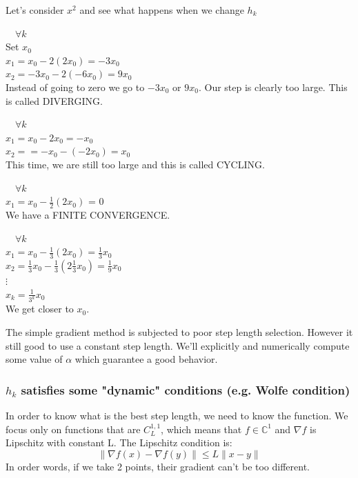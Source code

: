 \begin{example}\begin{leftbar}
Let's consider $x^2$ and see what happens when we change $h_k$

 $\quad \forall k$ \\
Set $x_0$ \\
$x_1 = x_0 - 2(2x_0) = -3x_0$\\
$x_2 = -3x_0 - 2(-6x_0) = 9 x_0$\\
Instead of going to zero we go to $-3x_0$ or $9x_0$. Our step is clearly too large. This is called DIVERGING.

 $\quad \forall k$ \\
$x_1 = x_0 - 2x_0 = -x_0$\\
$x_2 = = -x_0 - (-2x_0) = x_0$ \\
This time, we are still too large and this is called CYCLING. 

 $\quad \forall k$ \\
$x_1 = x_0 - \frac{1}{2}(2x_0)$ = 0 \\
We have a FINITE CONVERGENCE. 

 $\quad \forall k$ \\
$x_1 = x_0 - \frac{1}{3}(2x_0) = \frac{1}{3}x_0$\\
$x_2 = \frac{1}{3}x_0 - \frac{1}{3}(2\frac{1}{3}x_0) = \frac{1}{9}x_0$\\
$\vdots$\\
$x_k = \frac{1}{3^k}x_0$ \\

We get closer to $x_0$. 

\end{leftbar}\end{example}

The simple gradient method is subjected to poor step length selection. However it still good to use a constant step length. We'll explicitly and numerically compute some value of $\alpha$ which guarantee a good behavior. 

\subsubsection{$h_k$ satisfies some "dynamic" conditions (e.g. Wolfe condition)}

In order to know what is the best step length, we need to know the function. We focus only on functions that are $C_L^{1,1}$, which means that $f \in \mathbb{C}^1$ and $\nabla f$ is Lipschitz with constant L. The Lipschitz condition is:
$$\| \nabla f(x) - \nabla f(y) \| \leq L \| x-y \|$$
In order words, if we take 2 points, their gradient can't be too different. 

